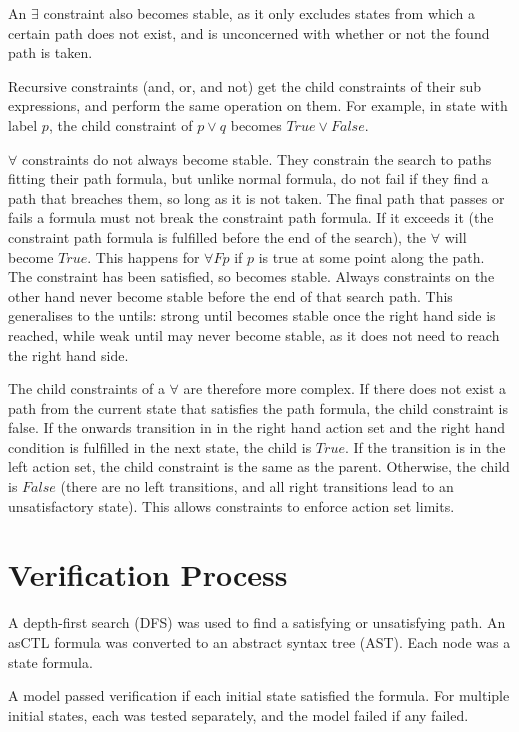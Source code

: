 \documentclass[a4paper,11pt]{article}
\begin{document}
	An $\exists$ constraint also becomes stable, as it only excludes states from which a certain path does not exist, and is unconcerned with whether or not the found path is taken.
	
	Recursive constraints (and, or, and not) get the child constraints of their sub expressions, and perform the same operation on them. For example, in state with label $p$, the child constraint of $p \lor q$ becomes $True \lor False$.
	
	$\forall$ constraints do not always become stable. They constrain the search to paths fitting their path formula, but unlike normal formula, do not fail if they find a path that breaches them, so long as it is not taken. The final path that passes or fails a formula must not break the constraint path formula. If it exceeds it (the constraint path formula is fulfilled before the end of the search), the $\forall$ will become $True$. This happens for $\forall F p$ if $p$ is true at some point along the path. The constraint has been satisfied, so becomes stable. Always constraints on the other hand never become stable before the end of that search path. This generalises to the untils: strong until becomes stable once the right hand side is reached, while weak until may never become stable, as it does not need to reach the right hand side. 
	
	The child constraints of a $\forall$ are therefore more complex. If there does not exist a path from the current state that satisfies the path formula, the child constraint is false. If the onwards transition in in the right hand action set and the right hand condition is fulfilled in the next state, the child is $True$. If the transition is in the left action set, the child constraint is the same as the parent. Otherwise, the child is $False$ (there are no left transitions, and all right transitions lead to an unsatisfactory state). This allows constraints to enforce action set limits.
	
	\section{Verification Process}
	A depth-first search (DFS) was used to find a satisfying or unsatisfying path. An asCTL formula was converted to an abstract syntax tree (AST). Each node was a state formula. 
	
	A model passed verification if each initial state satisfied the formula. For multiple initial states, each was tested separately, and the model failed if any failed.
	
\end{document}
